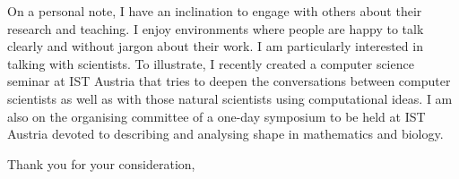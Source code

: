 \documentclass{letter}
\begin{document}
\begin{letter}{}
On a personal note, I have an inclination to engage with others about their research and teaching. I enjoy environments where people are happy to talk clearly and without jargon about their work. I am particularly interested in talking with scientists. To illustrate, I recently created a computer science seminar at IST Austria that tries to deepen the conversations between computer scientists as well as with those natural scientists using computational ideas. I am also on the organising committee of a one-day symposium to be held at IST Austria devoted to describing and analysing shape in mathematics and biology. 

\closing{Thank you for your consideration,}
\end{letter}
\end{document}
